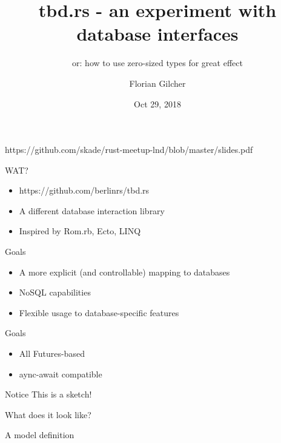 \documentclass{beamer}
\title[tbd.rs - an experiment with database interfaces]
{tbd.rs - an experiment with database interfaces}
\subtitle[or: how to use zero-sized types for great effect]
{or: how to use zero-sized types for great effect}
\author 
{Florian Gilcher}
\institute
{
  CEO and Rust Trainer\\
  Ferrous Systems GmbH\\
  Chairperson of a Ruby non-profit}
\date
{Oct 29, 2018}
\begin{document}
\begin{frame}{}
  https://github.com/skade/rust-meetup-lnd/blob/master/slides.pdf
\end{frame}

\begin{frame}
  \titlepage
\end{frame}



\begin{frame}{WAT?}
  \begin{itemize}
    \item https://github.com/berlinrs/tbd.rs
    \item A different database interaction library
    \item Inspired by Rom.rb, Ecto, LINQ
  \end{itemize}
\end{frame}

\begin{frame}{Goals}
  \begin{itemize}
    \item A more explicit (and controllable) mapping to databases
    \item NoSQL capabilities
    \item Flexible usage to database-specific features
  \end{itemize}
\end{frame}

\begin{frame}{Goals}
  \begin{itemize}
    \item All Futures-based
    \item aync-await compatible
  \end{itemize}
\end{frame}

\begin{frame}{Notice}
  This is a sketch!
\end{frame}

\begin{frame}{What does it look like?}
\end{frame}

\begin{frame}{A model definition}
\end{frame}
\end{document}
